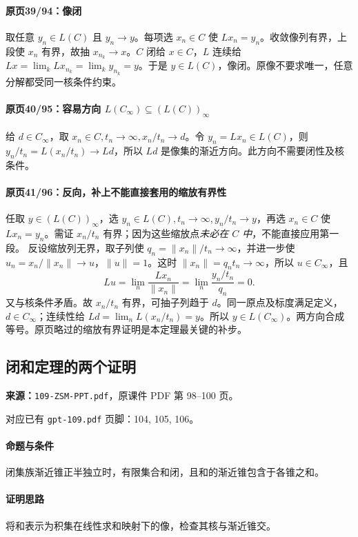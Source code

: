 \paragraph{原页39/94：像闭}
取任意 $y_n\in L(C)$ 且 $y_n\to y$。每项选 $x_n\in C$ 使 $Lx_n=y_n$。收敛像列有界，上段使 $x_n$ 有界，故抽 $x_{n_k}\to x$。$C$ 闭给 $x\in C$，$L$ 连续给 $Lx=\lim_kLx_{n_k}=\lim_ky_{n_k}=y$。于是 $y\in L(C)$，像闭。原像不要求唯一，任意分解都受同一核条件约束。
\paragraph{原页40/95：容易方向 $L(C_\infty)\subseteq(L(C))_\infty$}
给 $d\in C_\infty$，取 $x_n\in C,t_n\to\infty,x_n/t_n\to d$。令 $y_n=Lx_n\in L(C)$，则 $y_n/t_n=L(x_n/t_n)\to Ld$，所以 $Ld$ 是像集的渐近方向。此方向不需要闭性及核条件。
\paragraph{原页41/96：反向，补上不能直接套用的缩放有界性}
任取 $y\in(L(C))_\infty$，选 $y_n\in L(C),t_n\to\infty,y_n/t_n\to y$，再选 $x_n\in C$ 使 $Lx_n=y_n$。需证 $x_n/t_n$ 有界；因为这些缩放点\emph{未必在 $C$ 中}，不能直接应用第一段。
反设缩放列无界，取子列使 $q_n=\|x_n\|/t_n\to\infty$，并进一步使 $u_n=x_n/\|x_n\|\to u$，$\|u\|=1$。这时 $\|x_n\|=q_nt_n\to\infty$，所以 $u\in C_\infty$，且
\[Lu=\lim_n\frac{Lx_n}{\|x_n\|}=\lim_n\frac{y_n/t_n}{q_n}=0.\]
又与核条件矛盾。故 $x_n/t_n$ 有界，可抽子列趋于 $d$。同一原点及标度满足定义，$d\in C_\infty$；连续性给 $Ld=\lim_nL(x_n/t_n)=y$。所以 $y\in L(C_\infty)$。两方向合成等号。原页略过的缩放有界证明是本定理最关键的补步。

\clearpage\subsection{闭和定理的两个证明}
\textbf{来源：}\texttt{109-ZSM-PPT.pdf}，原课件 PDF 第 98--100 页。\par
对应已有 \texttt{gpt-109.pdf} 页脚：104, 105, 106。\par
\paragraph{命题与条件}闭集族渐近锥正半独立时，有限集合和闭，且和的渐近锥包含于各锥之和。
\paragraph{证明思路}将和表示为积集在线性求和映射下的像，检查其核与渐近锥交。
